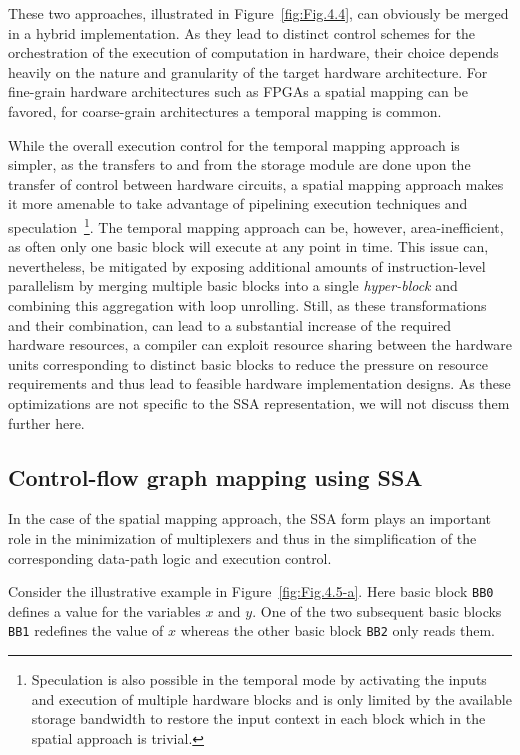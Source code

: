 These two approaches, illustrated in Figure~\ref{fig:Fig.4.4}, can obviously be merged in a hybrid implementation. 
As they lead to distinct control schemes for the orchestration of the execution of computation in hardware, their choice depends heavily on the nature and granularity of the target hardware architecture. 
For fine-grain hardware architectures such as FPGAs a spatial mapping can be favored, for coarse-grain architectures a temporal mapping is common.

While the overall execution control for the temporal mapping approach is simpler, as the transfers to and from the storage module are done upon the transfer of control between hardware circuits, a spatial mapping approach makes it more amenable to take advantage of pipelining execution techniques and speculation~\footnote{Speculation is also possible in the temporal mode by activating the inputs and execution of multiple hardware blocks and is only limited by the available storage bandwidth to restore the input context in each block which in the spatial approach is trivial.}. 
The temporal mapping approach can be, however, area-inefficient, as often only one basic block will execute at any point in time. 
This issue can, nevertheless, be mitigated by exposing additional amounts of instruction-level parallelism by merging multiple basic blocks into a single {\em hyper-block} and combining this aggregation with loop unrolling. 
Still, as these transformations and their combination, can lead to a substantial increase of the required hardware resources, a compiler can exploit resource sharing between the hardware units corresponding to distinct basic blocks to reduce the pressure on resource requirements and thus lead to feasible hardware implementation designs. 
As these optimizations are not specific to the SSA representation, we will not discuss them further here. 

\subsection{Control-flow graph mapping using SSA}
\label{sec:cfg_ssa_mapping}
In the case of the spatial mapping approach, the SSA form plays an important role in the minimization of multiplexers and thus in the simplification of the corresponding data-path logic and execution control.

Consider the illustrative example in Figure~\ref{fig:Fig.4.5-a}. 
Here basic block {\tt BB0} defines a value for the variables $x$ and $y$. 
One of the two subsequent basic blocks {\tt BB1} redefines the value of $x$ whereas the other basic block {\tt BB2} only reads them.

